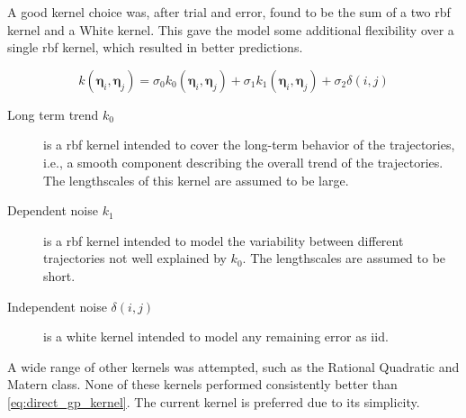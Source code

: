A good kernel choice was, after trial and error, found to be the sum of a two \acrshort{rbf} kernel and a White kernel. This gave the model some additional flexibility over a single \acrshort{rbf} kernel, which resulted in better predictions.

\begin{equation}\label{eq:direct_gp_kernel}
    k(\boldsymbol{\eta}_i, \boldsymbol{\eta}_j) = \sigma_0 k_0(\boldsymbol{\eta}_i, \boldsymbol{\eta}_j) + \sigma_1 k_1(\boldsymbol{\eta}_i, \boldsymbol{\eta}_j) +  \sigma_2 \delta(i, j)
\end{equation}

\begin{description}
    \item[Long term trend $k_0$] is a \acrshort{rbf} kernel intended to cover the long-term behavior of the trajectories, i.e., a smooth component describing the overall trend of the trajectories. The lengthscales of this kernel are assumed to be large.
    \item[Dependent noise $k_1$] is a \acrshort{rbf} kernel intended to model the variability between different trajectories not well explained by $k_0$. The lengthscales are assumed to be short.
    \item[Independent noise $\delta(i, j)$] is a white kernel intended to model any remaining error as \acrshort{iid}.
\end{description} 

A wide range of other kernels was attempted, such as the Rational Quadratic and Matern class. None of these kernels performed consistently better than \cref{eq:direct_gp_kernel}. The current kernel is preferred due to its simplicity. 
